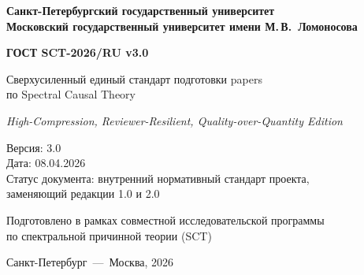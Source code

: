 \documentclass[12pt,a4paper]{article}
\begin{document}
\begin{titlepage}
\centering

\vspace*{1cm}

{\large\bfseries
Санкт-Петербургский государственный университет\\[0.3cm]
Московский государственный университет имени М.\,В.~Ломоносова
}

\vspace{2cm}

{\LARGE\bfseries
ГОСТ SCT-2026/RU v3.0
}

\vspace{0.8cm}

{\Large
Сверхусиленный единый стандарт подготовки papers\\
по Spectral Causal Theory
}

\vspace{0.5cm}

{\large\itshape
High-Compression, Reviewer-Resilient, Quality-over-Quantity Edition
}

\vspace{2cm}

{\large
Версия: 3.0\\[0.2cm]
Дата: 08.04.2026\\[0.2cm]
Статус документа: внутренний нормативный стандарт проекта,\\
заменяющий редакции 1.0 и 2.0
}

\vspace{3cm}

{\normalsize
Подготовлено в рамках совместной исследовательской программы\\
по спектральной причинной теории (SCT)
}

\vfill

{\small Санкт-Петербург~---~Москва, 2026}

\end{titlepage}
\end{document}
